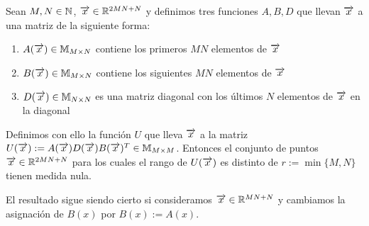 \begin{lema} \label{lema:primer_lema}

    Sean $M, N \in \mathbb{N}$, $\overrightarrow{x} \in \mathbb{R}^{2MN + N}$ y definimos tres funciones $A, B, D$ que llevan $\overrightarrow{x}$ a una matriz de la siguiente forma:

    \begin{enumerate}
        \item $A(\overrightarrow{x}) \in \mathbb{M}_{M \times N}$ contiene los primeros $MN$ elementos de $\overrightarrow{x}$
        \item $B(\overrightarrow{x}) \in \mathbb{M}_{M \times N}$ contiene los siguientes $MN$ elementos de $\overrightarrow{x}$
        \item $D(\overrightarrow{x}) \in \mathbb{M}_{N \times N}$ es una matriz diagonal con los últimos $N$ elementos de $\overrightarrow{x}$ en la diagonal
    \end{enumerate}

    Definimos con ello la función $U$ que lleva $\overrightarrow{x}$ a la matriz $U(\overrightarrow{x}) := A(\overrightarrow{x}) D(\overrightarrow{x}) B(\overrightarrow{x})^T \in \mathbb{M}_{M \times M}$. Entonces el conjunto de puntos $\overrightarrow{x} \in \mathbb{R}^{2MN + N}$ para los cuales el rango de $U(\overrightarrow{x})$ es distinto de $r := \min \{M, N\}$ tienen medida nula.

    El resultado sigue siendo cierto si consideramos $\overrightarrow{x} \in \mathbb{R}^{MN+N}$ y cambiamos la asignación de $B(x)$ por $B(x) := A(x)$.
\end{lema}


